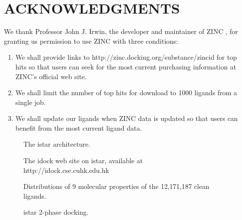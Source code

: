 \documentclass[12pt]{article}
\begin{document}
\section*{\sffamily \large ACKNOWLEDGMENTS}

We thank Professor John J. Irwin, the developer and maintainer of ZINC \citep{532,1178}, for granting us permission to use ZINC with three conditions:
\begin{enumerate}
\item We shall provide links to http://zinc.docking.org/substance/zincid for top hits so that users can seek for the most current purchasing information at ZINC's official web site.
\item We shall limit the number of top hits for download to 1000 ligands from a single job.
\item We shall update our ligands when ZINC data is updated so that users can benefit from the most current ligand data.
\end{enumerate}


\clearpage





\clearpage

\begin{figure}
\caption{\label{architecture} The istar architecture.}
\end{figure}

\begin{figure}
\caption{\label{idock} The idock web site on istar, available at http://idock.cse.cuhk.edu.hk}
\end{figure}

\begin{figure}
\caption{\label{LigandProperties} Distributions of 9 molecular properties of the 12,171,187 clean ligands.}
\end{figure}

\begin{figure}
\caption{\label{2PhaseDocking} istar 2-phase docking.}
\end{figure}
\end{document}
